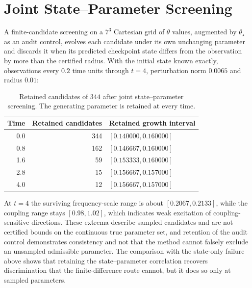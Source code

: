 \documentclass[11pt,notitlepage]{report}
\theoremstyle{definition}
\theoremstyle{remark}
\begin{document}
\section{Joint State--Parameter Screening}
A finite-candidate screening on a $7^3$ Cartesian grid of $\theta$ values, augmented by $\theta_\star$ as an audit control, evolves each candidate under its own unchanging parameter and discards it when its predicted checkpoint state differs from the observation by more than the certified radius. With the initial state known exactly, observations every $0.2$ time units through $t=4$, perturbation norm $0.0065$ and radius $0.01$:
\begin{table}[ht]\centering\small
\caption{Retained candidates of $344$ after joint state--parameter screening. The generating parameter is retained at every time.}
\begin{tabular}{rrl}\toprule
Time&Retained candidates&Retained growth interval\\\midrule
0.0&344&$[0.140000,0.160000]$\\
0.8&162&$[0.146667,0.160000]$\\
1.6&59&$[0.153333,0.160000]$\\
2.8&15&$[0.156667,0.157000]$\\
4.0&12&$[0.156667,0.157000]$\\\bottomrule
\end{tabular}
\end{table}
At $t=4$ the surviving frequency-scale range is about $[0.2067,0.2133]$, while the coupling range stays $[0.98,1.02]$, which indicates weak excitation of coupling-sensitive directions. These extrema describe sampled candidates and are not certified bounds on the continuous true parameter set, and retention of the audit control demonstrates consistency and not that the method cannot falsely exclude an unsampled admissible parameter. The comparison with the state-only failure above shows that retaining the state--parameter correlation recovers discrimination that the finite-difference route cannot, but it does so only at sampled parameters.
\end{document}
